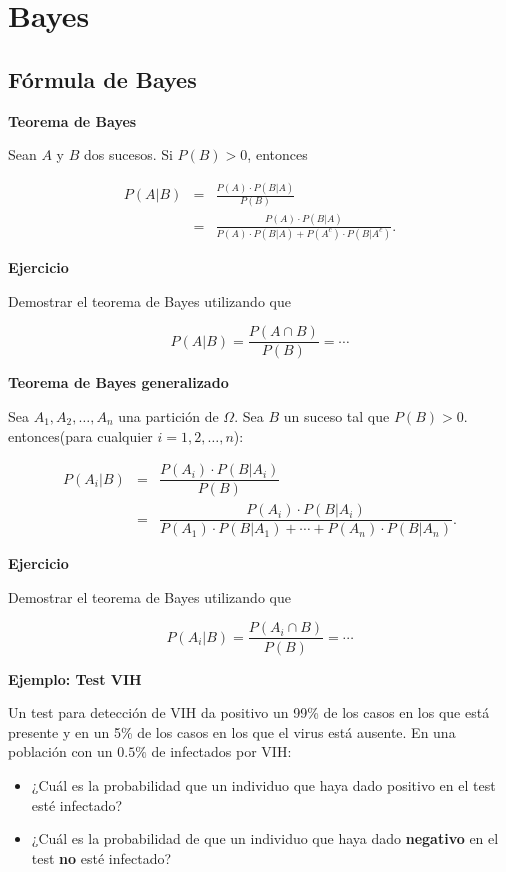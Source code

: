 \documentclass[]{book}
\providecommand{\tightlist}{%
  \setlength{\itemsep}{0pt}\setlength{\parskip}{0pt}}
\begin{document}
\hypertarget{bayes}{%
\section{Bayes}\label{bayes}}

\hypertarget{fuxf3rmula-de-bayes}{%
\subsection{Fórmula de Bayes}\label{fuxf3rmula-de-bayes}}

 \textbf{Teorema de Bayes}

Sean \(A\) y \(B\) dos sucesos. Si \(P(B)>0\), entonces

\begin{eqnarray*}
P(A|B) & = & \frac{P(A)\cdot P(B\big|A)}{P(B)}\\
&=& \frac{P(A)\cdot P(B\big|A)}{P(A)\cdot P(B\big|A)+P(A^c)\cdot P(B\big|A^c)}.
\end{eqnarray*}

\textbf{Ejercicio}

Demostrar el teorema de Bayes utilizando que

\[P(A|B) =\frac{P(A\cap B)}{P(B)}=\cdots\]

 \textbf{Teorema de Bayes generalizado}

Sea \(A_1,A_2,\ldots,A_n\) una partición de \(\Omega\). Sea \(B\) un suceso tal que \(P(B)>0\). entonces(para cualquier \(i=1,2,\ldots,n\)):

\begin{eqnarray*}
P(A_i|B) & =& \dfrac{P(A_i)\cdot P(B|A_i)}{P(B)}\\
& =& \dfrac{P(A_i)\cdot P(B|A_i)}{P(A_1)\cdot P(B|A_1)+\cdots+P(A_n)\cdot P(B|A_n)}.
\end{eqnarray*}

\textbf{Ejercicio}

Demostrar el teorema de Bayes utilizando que

\[P(A_i|B) =\dfrac{P(A_i\cap B)}{P(B)}=\cdots\]

\textbf{Ejemplo: Test VIH}

Un test para detección de VIH da positivo un 99\% de los casos en los que está presente y en un 5\% de los casos en los que el virus está ausente. En una población con un \(0.5\%\) de infectados por VIH:

\begin{itemize}
\tightlist
\item
  ¿Cuál es la probabilidad que un individuo que haya dado positivo en el test esté infectado?
\item
  ¿Cuál es la probabilidad de que un individuo que haya dado \textbf{negativo} en el test \textbf{no} esté infectado?
\end{itemize}
\end{document}
